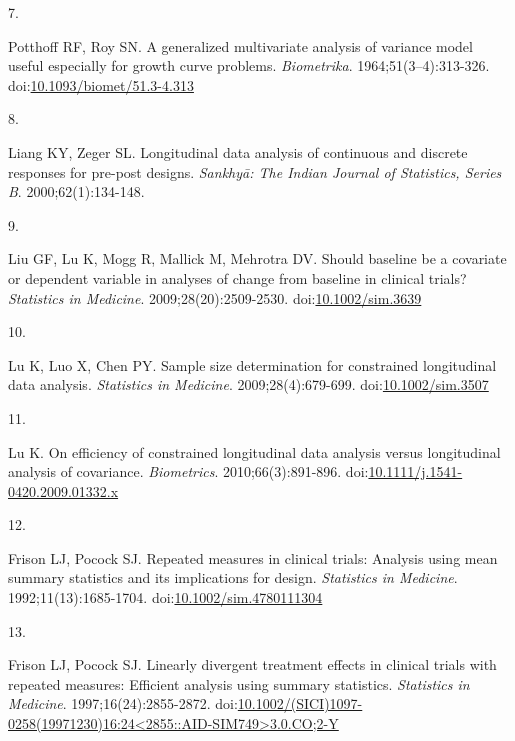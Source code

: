\documentclass[
  11pt,
]{article}
\newlength{\cslhangindent}
\newlength{\csllabelwidth}
\newenvironment{CSLReferences}[2] %
 {\begin{list}{}{%
  \setlength{\itemindent}{0pt}
  \setlength{\leftmargin}{0pt}
  \setlength{\parsep}{0pt}
  \ifodd #1
   \setlength{\leftmargin}{\cslhangindent}
   \setlength{\itemindent}{-1\cslhangindent}
  \fi
  \setlength{\itemsep}{#2\baselineskip}}}
 {\end{list}}
\newcommand{\CSLLeftMargin}[1]{\parbox[t]{\csllabelwidth}{\strut#1\strut}}
\newcommand{\CSLRightInline}[1]{\parbox[t]{\linewidth - \csllabelwidth}{\strut#1\strut}}
\begin{document}
\begin{CSLReferences}{0}{1}
\CSLLeftMargin{7. }%
\CSLRightInline{Potthoff RF, Roy SN. A generalized multivariate analysis of variance model useful especially for growth curve problems. \emph{Biometrika}. 1964;51(3--4):313-326. doi:\href{https://doi.org/10.1093/biomet/51.3-4.313}{10.1093/biomet/51.3-4.313}}

\CSLLeftMargin{8. }%
\CSLRightInline{Liang KY, Zeger SL. Longitudinal data analysis of continuous and discrete responses for pre-post designs. \emph{Sankhyā: The Indian Journal of Statistics, Series B}. 2000;62(1):134-148.}

\CSLLeftMargin{9. }%
\CSLRightInline{Liu GF, Lu K, Mogg R, Mallick M, Mehrotra DV. Should baseline be a covariate or dependent variable in analyses of change from baseline in clinical trials? \emph{Statistics in Medicine}. 2009;28(20):2509-2530. doi:\href{https://doi.org/10.1002/sim.3639}{10.1002/sim.3639}}

\CSLLeftMargin{10. }%
\CSLRightInline{Lu K, Luo X, Chen PY. Sample size determination for constrained longitudinal data analysis. \emph{Statistics in Medicine}. 2009;28(4):679-699. doi:\href{https://doi.org/10.1002/sim.3507}{10.1002/sim.3507}}

\CSLLeftMargin{11. }%
\CSLRightInline{Lu K. On efficiency of constrained longitudinal data analysis versus longitudinal analysis of covariance. \emph{Biometrics}. 2010;66(3):891-896. doi:\href{https://doi.org/10.1111/j.1541-0420.2009.01332.x}{10.1111/j.1541-0420.2009.01332.x}}

\CSLLeftMargin{12. }%
\CSLRightInline{Frison LJ, Pocock SJ. Repeated measures in clinical trials: Analysis using mean summary statistics and its implications for design. \emph{Statistics in Medicine}. 1992;11(13):1685-1704. doi:\href{https://doi.org/10.1002/sim.4780111304}{10.1002/sim.4780111304}}

\CSLLeftMargin{13. }%
\CSLRightInline{Frison LJ, Pocock SJ. Linearly divergent treatment effects in clinical trials with repeated measures: Efficient analysis using summary statistics. \emph{Statistics in Medicine}. 1997;16(24):2855-2872. doi:\href{https://doi.org/10.1002/(SICI)1097-0258(19971230)16:24\%3C2855::AID-SIM749\%3E3.0.CO;2-Y}{10.1002/(SICI)1097-0258(19971230)16:24\textless2855::AID-SIM749\textgreater3.0.CO;2-Y}}


\end{CSLReferences}
\end{document}
